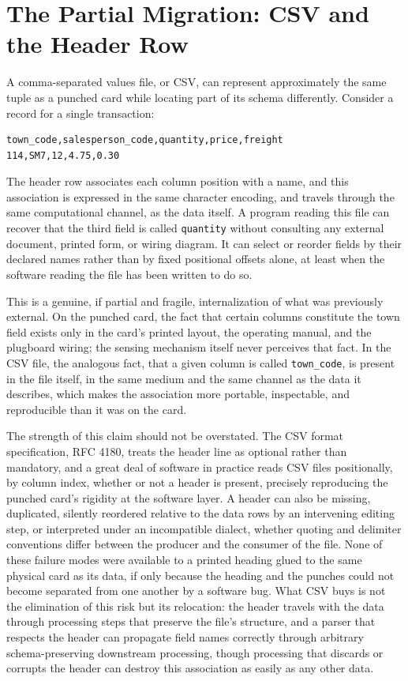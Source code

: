 \documentclass[11pt]{article}
\begin{document}
\section{The Partial Migration: CSV and the Header Row}

A comma-separated values file, or CSV, can represent approximately the same tuple as a punched card while locating part of its schema differently. Consider a record for a single transaction:
\begin{lstlisting}
town_code,salesperson_code,quantity,price,freight
114,SM7,12,4.75,0.30
\end{lstlisting}
The header row associates each column position with a name, and this association is expressed in the same character encoding, and travels through the same computational channel, as the data itself. A program reading this file can recover that the third field is called \texttt{quantity} without consulting any external document, printed form, or wiring diagram. It can select or reorder fields by their declared names rather than by fixed positional offsets alone, at least when the software reading the file has been written to do so.

This is a genuine, if partial and fragile, internalization of what was previously external. On the punched card, the fact that certain columns constitute the town field exists only in the card's printed layout, the operating manual, and the plugboard wiring; the sensing mechanism itself never perceives that fact. In the CSV file, the analogous fact, that a given column is called \texttt{town\_code}, is present in the file itself, in the same medium and the same channel as the data it describes, which makes the association more portable, inspectable, and reproducible than it was on the card.

The strength of this claim should not be overstated. The CSV format specification, RFC 4180, treats the header line as optional rather than mandatory, and a great deal of software in practice reads CSV files positionally, by column index, whether or not a header is present, precisely reproducing the punched card's rigidity at the software layer. A header can also be missing, duplicated, silently reordered relative to the data rows by an intervening editing step, or interpreted under an incompatible dialect, whether quoting and delimiter conventions differ between the producer and the consumer of the file. None of these failure modes were available to a printed heading glued to the same physical card as its data, if only because the heading and the punches could not become separated from one another by a software bug. What CSV buys is not the elimination of this risk but its relocation: the header travels with the data through processing steps that preserve the file's structure, and a parser that respects the header can propagate field names correctly through arbitrary schema-preserving downstream processing, though processing that discards or corrupts the header can destroy this association as easily as any other data.
\end{document}
